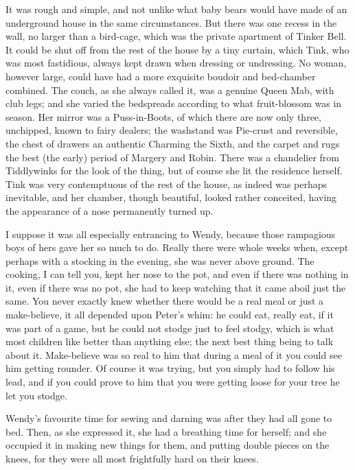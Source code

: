 It was rough and simple, and not unlike what baby bears would have made
of an underground house in the same circumstances. But there was one
recess in the wall, no larger than a bird-cage, which was the private
apartment of Tinker Bell. It could be shut off from the rest of the
house by a tiny curtain, which Tink, who was most fastidious, always
kept drawn when dressing or undressing. No woman, however large, could
have had a more exquisite boudoir and bed-chamber combined. The couch,
as she always called it, was a genuine Queen Mab, with club legs; and
she varied the bedspreads according to what fruit-blossom was in
season. Her mirror was a Puss-in-Boots, of which there are now only
three, unchipped, known to fairy dealers; the washstand was Pie-crust
and reversible, the chest of drawers an authentic Charming the Sixth,
and the carpet and rugs the best (the early) period of Margery and
Robin. There was a chandelier from Tiddlywinks for the look of the
thing, but of course she lit the residence herself. Tink was very
contemptuous of the rest of the house, as indeed was perhaps
inevitable, and her chamber, though beautiful, looked rather conceited,
having the appearance of a nose permanently turned up.

I suppose it was all especially entrancing to Wendy, because those
rampagious boys of hers gave her so much to do. Really there were whole
weeks when, except perhaps with a stocking in the evening, she was
never above ground. The cooking, I can tell you, kept her nose to the
pot, and even if there was nothing in it, even if there was no pot, she
had to keep watching that it came aboil just the same. You never
exactly knew whether there would be a real meal or just a make-believe,
it all depended upon Peter's whim: he could eat, really eat, if it was
part of a game, but he could not stodge just to feel stodgy, which is
what most children like better than anything else; the next best thing
being to talk about it. Make-believe was so real to him that during a
meal of it you could see him getting rounder. Of course it was trying,
but you simply had to follow his lead, and if you could prove to him
that you were getting loose for your tree he let you stodge.

Wendy's favourite time for sewing and darning was after they had all
gone to bed. Then, as she expressed it, she had a breathing time for
herself; and she occupied it in making new things for them, and putting
double pieces on the knees, for they were all most frightfully hard on
their knees.

